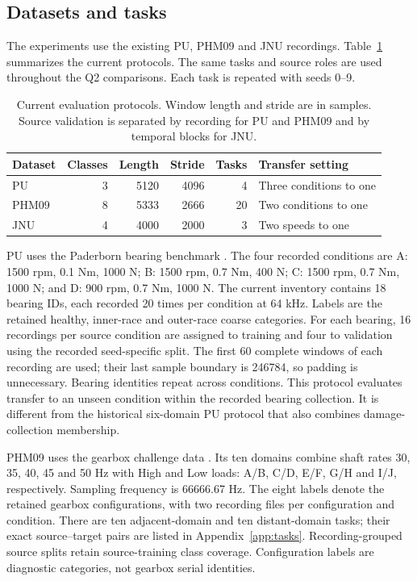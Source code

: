 \subsection{Datasets and tasks}
The experiments use the existing PU, PHM09 and JNU recordings. Table~\ref{tab:data}
summarizes the current protocols. The same tasks and source roles are used
throughout the Q2 comparisons. Each task is repeated with seeds 0--9.

\begin{table}[pos=htbp]
\centering\small
\caption{Current evaluation protocols. Window length and stride are in samples.
Source validation is separated by recording for PU and PHM09 and by temporal
blocks for JNU.}
\label{tab:data}
\begin{tabular}{lrrrrl}
\toprule
Dataset & Classes & Length & Stride & Tasks & Transfer setting\\
\midrule
PU & 3 & 5120 & 4096 & 4 & Three conditions to one\\
PHM09 & 8 & 5333 & 2666 & 20 & Two conditions to one\\
JNU & 4 & 4000 & 2000 & 3 & Two speeds to one\\
\bottomrule
\end{tabular}
\end{table}

PU uses the Paderborn bearing benchmark \cite{pu}. The four recorded conditions
are A: 1500 rpm, 0.1 Nm, 1000 N; B: 1500 rpm, 0.7 Nm, 400 N;
C: 1500 rpm, 0.7 Nm, 1000 N; and D: 900 rpm, 0.7 Nm, 1000 N.
The current inventory contains 18 bearing IDs, each recorded 20 times per
condition at 64 kHz. Labels are the retained healthy, inner-race and outer-race
coarse categories. For each bearing, 16 recordings per source condition are
assigned to training and four to validation using the recorded seed-specific
split. The first 60 complete windows of each recording are used; their last
sample boundary is 246784, so padding is unnecessary. Bearing identities repeat
across conditions. This protocol evaluates transfer to an unseen condition
within the recorded bearing collection. It is different from the historical
six-domain PU protocol that also combines damage-collection membership.

PHM09 uses the gearbox challenge data \cite{phm09}. Its ten domains combine
shaft rates 30, 35, 40, 45 and 50 Hz with High and Low loads: A/B, C/D, E/F, G/H and
I/J, respectively. Sampling frequency is 66666.67 Hz. The eight labels denote
the retained gearbox configurations, with two recording files per
configuration and condition. There are ten adjacent-domain and ten distant-domain
tasks; their exact source--target pairs are listed in Appendix~\ref{app:tasks}.
Recording-grouped source splits retain source-training class coverage.
Configuration labels are diagnostic categories, not gearbox serial identities.

